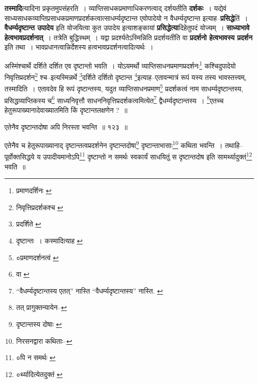 \documentclass[article,12pt,a4paper]{memoir}
\begin{document}
	  \pstart \textbf{तस्मादि}त्यादिना प्रकृतमुपसंहरति । व्याप्तिसाधकप्रमाणाधिकरणत्वाद् दर्शयतीति \textbf{दर्शकः} । यद्येवं साध्यसाधकव्याप्तिप्रसाधकप्रमाणप्रदर्शकत्वात्साधर्म्यदृष्टान्त एवोपादेयो न वैधर्म्यदृष्टान्त इत्याह--\textbf{प्रसिद्धे}तिं । \textbf{वैधर्म्यदृष्टान्त उपादेय} इति योजयित्वा कुत उपादेय इत्याशङ्कायां \textbf{प्रसिद्धेत्या}दिहेतुपदं योज्यम् । \textbf{साध्याभावे हेत्वभावप्रदर्शनात्} । तत्रेति बुद्धिस्थम् । यद्वा प्रदर्श्यतेऽस्मिन्निति प्रदर्शयतीति वा \textbf{प्रदर्शनो हेत्वभावस्य प्रदर्शन} इति तथा । भावप्रधानत्वान्निर्देशस्य हत्वभावप्रदर्शनत्वादित्यर्थः ।
	\pend
	  \bigskip
	  \begingroup
	

	  \pstart अस्मिंश्चार्थे दर्शिते दर्शित एव दृष्टान्तो भवति । योऽयमर्थो व्याप्तिसाधनप्रमाणप्रदर्शनः\footnote{प्रमाणदर्शिनः \cite{dp-msA} \cite{dp-msB} \cite{dp-edP} \cite{dp-edH} \cite{dp-edN}} कश्चिदुपादेयो निवृत्तिप्रदर्शन\footnote{निवृत्तिप्रदर्शकश्च \cite{dp-msB}} श्च--इत्यस्मिन्नर्थे \footnote{प्रदर्शिते \cite{dp-msA} \cite{dp-edP} \cite{dp-edH} \cite{dp-edE} \cite{dp-edN}}\-दर्शिते दर्शितो दृष्टान्त \footnote{दृष्टान्तः । कस्मादित्याह \cite{dp-edE}}\-इत्याह--एतावन्मात्रं रूपं यस्य तस्य भावस्तत्त्वम्, तस्मादिति । एतावदेव हि रूपं दृष्टान्तस्य, यदुत व्याप्तिसाधनप्रमाण\footnote{०प्रमाणदर्शनत्वं \cite{dp-msA} \cite{dp-msB} \cite{dp-msD} \cite{dp-edP} \cite{dp-edH} \cite{dp-edE}} प्रदर्शकत्वं नाम साधर्म्यदृष्टान्तस्य, प्रसिद्धव्याप्तिकस्य च\footnote{वा \cite{dp-msA} \cite{dp-msB} \cite{dp-msD} \cite{dp-edP} \cite{dp-edH} \cite{dp-edE} \cite{dp-edN}} साध्यनिवृत्तौ साधननिवृत्तिप्रदर्शकत्वमित्येत\footnote{“वैधर्म्यदृष्टान्तस्य एतत्” नास्ति \cite{dp-msB} “वैधर्म्यदृष्टान्तस्य” नास्ति. \cite{dp-msD}} द्वैधर्म्यदृष्टान्तस्य । \footnote{तत् \cite{dp-msA} \cite{dp-msD} \cite{dp-edP} \cite{dp-edH} \cite{dp-edE} \cite{dp-edN} प्रागुक्तन्यायेन--\cite{dp-msD-n}}\-एतच्च हेतुरूपाख्यानादेवाख्यातमिति किं दृष्टान्तलक्षणेन ? ॥
	\pend
       
	  \bigskip
	  \begingroup
	

	  \pstart एतेनैव दृष्टान्तदोषा अपि निरस्ता भवन्ति ॥ १२३ ॥
	\pend
      
	  \endgroup
	 

	  \pstart एतेनैव च हेतुरूपाख्यानाद् दृष्टान्तत्वप्रदर्शनेन दृष्टान्तदोषा\footnote{दृष्टान्तस्य दोषाः \cite{dp-msA} \cite{dp-edP} \cite{dp-edH} \cite{dp-edE} \cite{dp-edN}} दृष्टान्ताभासाः\footnote{निरसनद्वारा कथिताः--\cite{dp-msD-n}} कथिता भवन्ति । तथाहि--पूर्वोक्तसिद्धये य उपादीयमानोऽपि\footnote{०पि न समर्थः \cite{dp-msB}} दृष्टान्तो न समर्थः स्वकार्यं साधयितुं स दृष्टान्तदोष इति सामर्थ्यादुक्तं\footnote{०र्थ्यादित्येतदुक्तं \cite{dp-msB}} भवति ॥
	\pend
      
\end{document}
